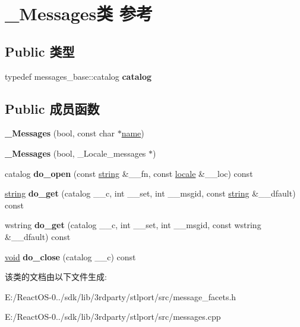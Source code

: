 \hypertarget{class___messages}{}\section{\+\_\+\+Messages类 参考}
\label{class___messages}
\subsection*{Public 类型}
\begin{DoxyCompactItemize}
\item 
\mbox{\label{class___messages_a28fd7968b59cdc564cd518dbc8b1aa1d}} 
typedef messages\+\_\+base\+::catalog {\bfseries catalog}
\end{DoxyCompactItemize}
\subsection*{Public 成员函数}
\begin{DoxyCompactItemize}
\item 
\mbox{\label{class___messages_aa6209d5c489ea8810d257f57dbc2357e}} 
{\bfseries \+\_\+\+Messages} (bool, const char $\ast$\hyperlink{structname}{name})
\item 
\mbox{\label{class___messages_aee4222d751623ff4e11b8e34d057c197}} 
{\bfseries \+\_\+\+Messages} (bool, \+\_\+\+Locale\+\_\+messages $\ast$)
\item 
\mbox{\label{class___messages_aa4f839cd21af2938e9c608057bef8461}} 
catalog {\bfseries do\+\_\+open} (const \hyperlink{structstring}{string} \&\+\_\+\+\_\+fn, const \hyperlink{classlocale}{locale} \&\+\_\+\+\_\+loc) const
\item 
\mbox{\label{class___messages_ae7cc38619c8051e6415334f4d7a06f82}} 
\hyperlink{structstring}{string} {\bfseries do\+\_\+get} (catalog \+\_\+\+\_\+c, int \+\_\+\+\_\+set, int \+\_\+\+\_\+msgid, const \hyperlink{structstring}{string} \&\+\_\+\+\_\+dfault) const
\item 
\mbox{\label{class___messages_a2a382b12c230c3b136868599b26caa33}} 
wstring {\bfseries do\+\_\+get} (catalog \+\_\+\+\_\+c, int \+\_\+\+\_\+set, int \+\_\+\+\_\+msgid, const wstring \&\+\_\+\+\_\+dfault) const
\item 
\mbox{\label{class___messages_a7ccd12c7a7002dbdf475969c1f60a9b3}} 
\hyperlink{interfacevoid}{void} {\bfseries do\+\_\+close} (catalog \+\_\+\+\_\+c) const
\end{DoxyCompactItemize}


该类的文档由以下文件生成\+:\begin{DoxyCompactItemize}
\item 
E\+:/\+React\+O\+S-\/0../sdk/lib/3rdparty/stlport/src/message\+\_\+facets.\+h\item 
E\+:/\+React\+O\+S-\/0../sdk/lib/3rdparty/stlport/src/messages.\+cpp\end{DoxyCompactItemize}
